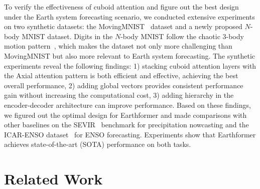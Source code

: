 \documentclass{article}
\def\nbody{$N$-body MNIST}
\begin{document}
To verify the effectiveness of cuboid attention and figure out the best design under the Earth system forecasting scenario, we conducted extensive experiments on two synthetic datasets: the MovingMNIST~\cite{shi2015convolutional} dataset and a newly proposed \nbody{} dataset. Digits in the \nbody{} follow the chaotic $3$-body motion pattern~\cite{mj2006three}, which makes the dataset not only more challenging than MovingMNIST but also more relevant to Earth system forecasting. The synthetic experiments reveal the following findings: 1) stacking cuboid attention layers with the Axial attention pattern is both efficient and effective, achieving the best overall performance, 2) adding global vectors provides consistent performance gain without increasing the computational cost, 3) adding hierarchy in the encoder-decoder architecture can improve performance. 
Based on these findings, we figured out the optimal design for Earthformer and made comparisons with other baselines on the SEVIR~\cite{veillette2020sevir} benchmark for precipitation nowcasting and the ICAR-ENSO dataset~\cite{ham2019deep} for ENSO forecasting. Experiments show that Earthformer achieves state-of-the-art (SOTA) performance on both tasks.









\section{Related Work}
\end{document}
